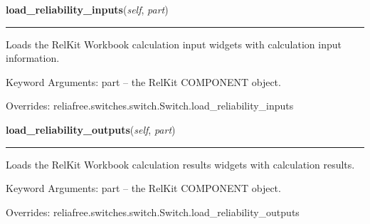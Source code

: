     \vspace{0.5ex}

\hspace{.8\funcindent}\begin{boxedminipage}{\funcwidth}

    \raggedright \textbf{load\_reliability\_inputs}(\textit{self}, \textit{part})

    \vspace{-1.5ex}

    \rule{\textwidth}{0.5\fboxrule}
\setlength{\parskip}{2ex}
    Loads the RelKit Workbook calculation input widgets with calculation
    input information.

    Keyword Arguments: part -- the RelKit COMPONENT object.

\setlength{\parskip}{1ex}
      Overrides: reliafree.switches.switch.Switch.load\_reliability\_inputs

    \end{boxedminipage}

    \vspace{0.5ex}

\hspace{.8\funcindent}\begin{boxedminipage}{\funcwidth}

    \raggedright \textbf{load\_reliability\_outputs}(\textit{self}, \textit{part})

    \vspace{-1.5ex}

    \rule{\textwidth}{0.5\fboxrule}
\setlength{\parskip}{2ex}
    Loads the RelKit Workbook calculation results widgets with 
    calculation results.

    Keyword Arguments: part -- the RelKit COMPONENT object.

\setlength{\parskip}{1ex}
      Overrides: reliafree.switches.switch.Switch.load\_reliability\_outputs

    \end{boxedminipage}

    \label{reliafree:switches:thumbwheel:Thumbwheel:calculate_mil_217_count}

    \vspace{0.5ex}

